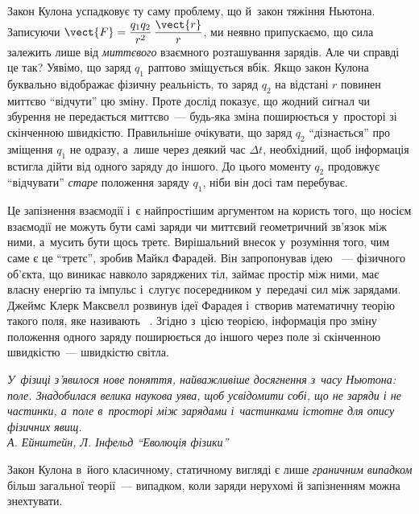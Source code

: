 Закон Кулона успадковує ту саму проблему, що й~закон тяжіння Ньютона. Записуючи $\vect{F}
	= \dfrac{q_1 q_2}{r^2}\,\dfrac{\vect{r}}{r}$, ми неявно припускаємо, що сила залежить лише
від \emph{миттєвого} взаємного розташування зарядів. Але чи справді це так? Уявімо, що
заряд $q_1$ раптово зміщується вбік. Якщо закон Кулона буквально відображає фізичну
реальність, то заряд $q_2$ на відстані $r$ повинен миттєво \enquote{відчути} цю зміну.
Проте дослід показує, що жодний сигнал чи збурення не передається миттєво~--- будь-яка
зміна поширюється у~просторі зі скінченною швидкістю. Правильніше очікувати, що заряд
$q_2$ \enquote{дізнається} про зміщення $q_1$ не одразу, а~лише через деякий час $\Delta
	t$, необхідний, щоб інформація встигла дійти від одного заряду до іншого. До цього моменту
$q_2$ продовжує \enquote{відчувати} \emph{старе} положення заряду $q_1$, ніби він досі там
перебуває.

Це запізнення взаємодії і~є найпростішим аргументом на користь того, що носієм взаємодії не можуть бути
самі заряди чи миттєвий геометричний зв'язок між ними, а~мусить бути щось третє.
Вирішальний внесок у~розуміння того, чим саме є це \enquote{третє}, зробив Майкл Фарадей.
Він запропонував ідею ~--- фізичного об'єкта, що виникає навколо заряджених
тіл, займає простір між ними, має власну енергію та імпульс і~слугує посередником
у~передачі сил між зарядами. Джеймс Клерк Максвелл розвинув ідеї Фарадея і~створив
математичну теорію такого поля, яке називають ~\cite{Maxwell1865}. Згідно з~цією
теорією, інформація про зміну положення одного заряду поширюється до іншого через поле зі
скінченною швидкістю~--- швидкістю світла.

\begin{tornpage}\small\itshape
	У~фізиці з'явилося нове поняття, найважливіше досягнення з~часу Ньютона: поле.
	Знадобилася велика наукова уява, щоб усвідомити собі, що не заряди і не частинки,
	а~поле в~просторі між зарядами і~частинками істотне для опису фізичних явищ.\\

	\hfill А. Ейнштейн, Л. Інфельд \enquote{Еволюція фізики}
\end{tornpage}

\vspace*{1.5ex}

Закон Кулона в~його класичному, статичному вигляді є лише \emph{граничним випадком} більш
загальної теорії~--- випадком, коли заряди нерухомі й запізненням можна знехтувати.



